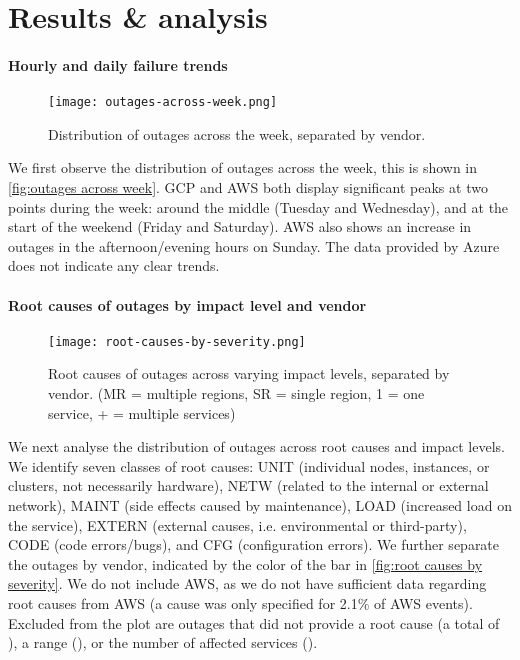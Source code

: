 \section{Results \& analysis}

\paragraph{Hourly and daily failure trends}
\begin{figure}[h]
  \centering
  \texttt{[image: outages-across-week.png]}
  \caption{Distribution of outages across the week, separated by vendor.}
  \label{fig:outages across week}
\end{figure}

We first observe the distribution of outages across the week, this is shown in \autoref{fig:outages across week}.
GCP and AWS both display significant peaks at two points during the week: around the middle (Tuesday and Wednesday), and at the start of the weekend (Friday and Saturday).
AWS also shows an increase in outages in the afternoon/evening hours on Sunday.
The data provided by Azure does not indicate any clear trends.

\paragraph{Root causes of outages by impact level and vendor}
\begin{figure}
  \centering
  \texttt{[image: root-causes-by-severity.png]}
  \caption{Root causes of outages across varying impact levels, separated by vendor. (MR = multiple regions, SR = single region, 1 = one service, + = multiple services)}
  \label{fig:root causes by severity}
\end{figure}

We next analyse the distribution of outages across root causes and impact levels.
We identify seven classes of root causes: UNIT (individual nodes, instances, or clusters, not necessarily hardware), NETW (related to the internal or external network), MAINT (side effects caused by maintenance), LOAD (increased load on the service), EXTERN (external causes, i.e. environmental or third-party), CODE (code errors/bugs), and CFG (configuration errors).
We further separate the outages by vendor, indicated by the color of the bar in \autoref{fig:root causes by severity}.
We do not include AWS, as we do not have sufficient data regarding root causes from AWS (a cause was only specified for 2.1\% of AWS events).
Excluded from the plot are outages that did not provide a root cause (a total of ), a range (), or the number of affected services ().

